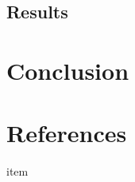 \documentclass[11pt, oneside]{article}
\begin{document}
\subsection{Results}


\section{Conclusion}


\section{References}

\noindent

\begin{description}

\item item

\end{description}
\end{document}
